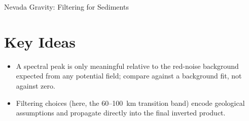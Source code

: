 \begin{activity}{Nevada Gravity: Filtering for Sediments}








\section*{Key Ideas}
\begin{itemize}
    \item A spectral peak is only meaningful relative to the red-noise background expected from any potential field; compare against a background fit, not against zero.
    \item Filtering choices (here, the 60--100~km transition band) encode geological assumptions and propagate directly into the final inverted product.
\end{itemize}

\end{activity}
